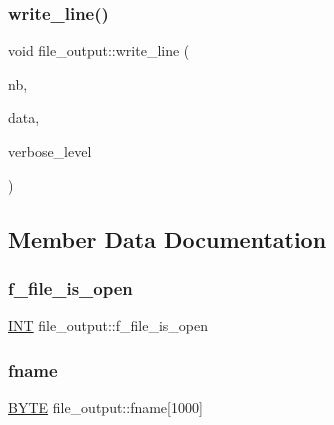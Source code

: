 \mbox{\label{classfile__output_a22e94c8e7a9da6d3cea1f65b2e0a891c}} 
\subsubsection{\texorpdfstring{write\+\_\+line()}{write\_line()}}
{\footnotesize\ttfamily void file\+\_\+output\+::write\+\_\+line (\begin{DoxyParamCaption}\item[{\mbox{\hyperlink{galois_8h_a09fddde158a3a20bd2dcadb609de11dc}{I\+NT}}}]{nb,  }\item[{\mbox{\hyperlink{galois_8h_a09fddde158a3a20bd2dcadb609de11dc}{I\+NT}} $\ast$}]{data,  }\item[{\mbox{\hyperlink{galois_8h_a09fddde158a3a20bd2dcadb609de11dc}{I\+NT}}}]{verbose\+\_\+level }\end{DoxyParamCaption})}



\subsection{Member Data Documentation}
\mbox{\label{classfile__output_a98ca4a76d2d3465d3a9136a70d2ee9fb}} 
\subsubsection{\texorpdfstring{f\+\_\+file\+\_\+is\+\_\+open}{f\_file\_is\_open}}
{\footnotesize\ttfamily \mbox{\hyperlink{galois_8h_a09fddde158a3a20bd2dcadb609de11dc}{I\+NT}} file\+\_\+output\+::f\+\_\+file\+\_\+is\+\_\+open}

\mbox{\label{classfile__output_acc70b107edd9ffbf93008d2de83274e5}} 
\subsubsection{\texorpdfstring{fname}{fname}}
{\footnotesize\ttfamily \mbox{\hyperlink{galois_8h_ab6cc7b4aeb6ea31aba2b3fbfc83ff5e6}{B\+Y\+TE}} file\+\_\+output\+::fname\mbox{[}1000\mbox{]}}

